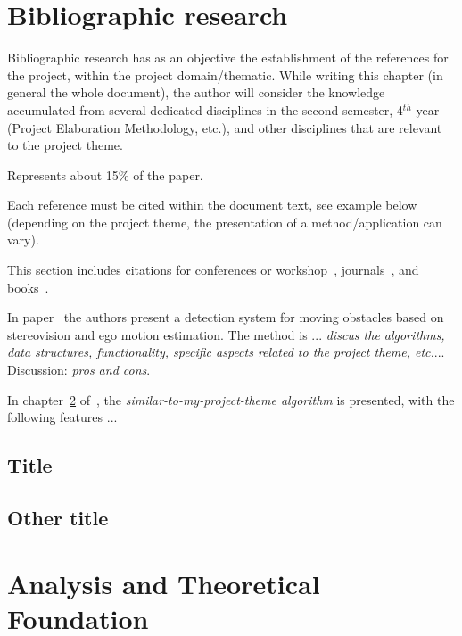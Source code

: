 \documentclass[12pt,a4paper,twoside]{report}
\begin{document}
\newpage

\tableofcontents
\newpage







\chapter{Bibliographic research}


Bibliographic research has as an objective the establishment of the references for the project, within the project domain/thematic. While writing this chapter (in general the whole document), the author will consider the knowledge accumulated from several dedicated disciplines in the second semester, 4$^{th}$ year (Project Elaboration Methodology, etc.), and other disciplines that are relevant to the project theme.

Represents about 15\% of the paper.

Each reference must be cited within the document text, see example below (depending on the project theme, the presentation of a method/application can vary).


This section includes citations for conferences or workshop~\cite{BellucciLZ04}, journals~\cite{AntoniouSBDB07}, 
and books~\cite{russell1995artificial}. 

In paper~\cite{AntoniouSBDB07} the authors present a detection system for moving obstacles based on stereovision and ego motion estimation. 
The method is ... {\it discus the algorithms, data structures, functionality, specific aspects related to the project theme, etc.}... Discussion: {\it pros and cons}.

In chapter~\ref{ch:analysis} of~\cite{strunk}, the {\it similar-to-my-project-theme algorithm} is presented, with the following features ...


\section{Title}
\section{Other title}


\chapter{Analysis and Theoretical Foundation}
\label{ch:analysis}
\end{document}
